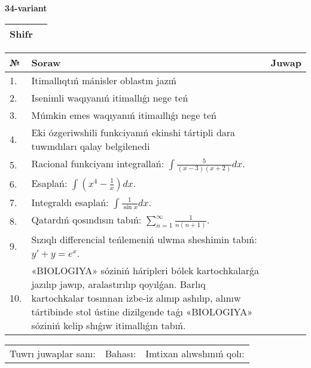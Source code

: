 \documentclass{article}
\begin{document}
  \egroup
  
  \newpage
  
  
  \textbf{34-variant}\\
  
  \bgroup
  \def\arraystretch{1.6} %
  
  \begin{tabular}{|m{5.7cm}|m{9.5cm}|}
  \hline
  Shifr & \\
  \hline
  \end{tabular}
  
  \vspace{1cm}
  
  \begin{tabular}{|m{0.7cm}|m{10cm}|m{4cm}|}
  \hline
  № & Soraw & Juwap \\
  \hline
  1. & Itimallıqtıń mánisler oblastın jazıń &  \\
  \hline
  2. & Isenimli waqıyanıń itimallıǵı nege teń &  \\
  \hline
  3. & Múmkin emes waqıyanıń itimaıllıǵı nege teń &  \\
  \hline
  4. & Eki ózgeriwshili funkciyanıń ekinshi tártipli dara tuwındıları qalay belgilenedi &  \\
  \hline
  5. & Racional funkciyanı integrallań: \(\int{\frac{5}{(x - 3)(x + 2)}dx}\). &  \\
  \hline
  6. & Esaplań: \(\int\left( x^{4} - \frac{1}{x} \right)dx\). &  \\
  \hline
  7. & Integraldı esaplań: \(\int{\frac{1}{\sin x}dx}\). &  \\
  \hline
  8. & Qatardıń qosındısın tabıń: \(\sum_{n = 1}^{\infty}\frac{1}{n(n + 1)}\). &  \\
  \hline
  9. & Sızıqlı differencial teńlemeniń ulwma sheshimin tabıń: \(y' + y = e^{x}\). &  \\
  \hline
  10. & «BIOLOGIYA» sóziniń háripleri bólek kartochkalarǵa jazılıp jawıp, aralastırılıp qoyılǵan. Barlıq kartochkalar tosınnan izbe-iz alınıp ashılıp, alınıw tártibinde stol ústine dizilgende taǵı «BIOLOGIYA» sóziniń kelip shıǵıw itimallıǵın tabıń. &  \\
  \hline
  \end{tabular}
  
  \vspace{1cm}
  
  \begin{tabular}{lll}
  Tuwrı juwaplar sanı: \underline{\hspace{1.5cm}} & 
  Bahası: \underline{\hspace{1.5cm}} & 
  Imtixan alıwshınıń qolı: \underline{\hspace{2cm}} \\
  \end{tabular}
  
\end{document}
